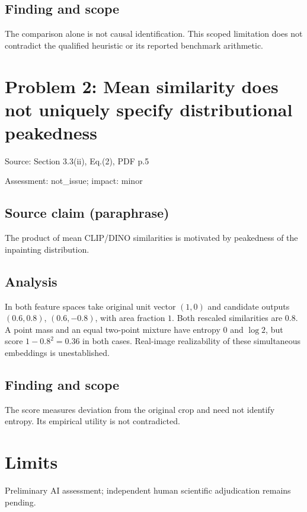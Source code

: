 \documentclass[11pt]{article}
\begin{document}
\subsection*{Finding and scope}

The comparison alone is not causal identification. This scoped limitation does not contradict the qualified heuristic or its reported benchmark arithmetic.

\section*{Problem 2: Mean similarity does not uniquely specify distributional peakedness}

Source: Section 3.3(ii), Eq.(2), PDF p.5

Assessment: not\_issue; impact: minor

\subsection*{Source claim (paraphrase)}

The product of mean CLIP/DINO similarities is motivated by peakedness of the inpainting distribution.

\subsection*{Analysis}

In both feature spaces take original unit vector \((1,0)\) and candidate outputs \((0.6,0.8)\), \((0.6,-0.8)\), with area fraction \(1\). Both rescaled similarities are \(0.8\). A point mass and an equal two-point mixture have entropy \(0\) and \(\log2\), but score \(1-0.8^2=0.36\) in both cases. Real-image realizability of these simultaneous embeddings is unestablished.

\subsection*{Finding and scope}

The score measures deviation from the original crop and need not identify entropy. Its empirical utility is not contradicted.

\section*{Limits}

Preliminary AI assessment; independent human scientific adjudication remains pending.\par
\end{document}
